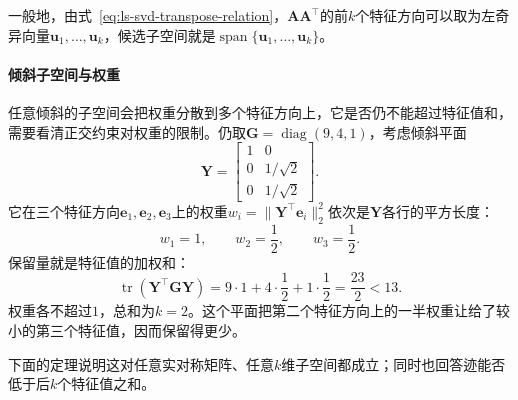 一般地，由式~\eqref{eq:ls-svd-transpose-relation}，$\bm A\bm A^\top$的前$k$个特征方向可以取为左奇异向量$\bm u_1,\ldots,\bm u_k$，候选子空间就是$\operatorname{span}\{\bm u_1,\ldots,\bm u_k\}$。

\paragraph{倾斜子空间与权重}
任意倾斜的子空间会把权重分散到多个特征方向上，它是否仍不能超过特征值和，需要看清正交约束对权重的限制。仍取$\bm G=\operatorname{diag}(9,4,1)$，考虑倾斜平面
\[
 \bm Y=\begin{bmatrix}1&0\\0&1/\sqrt2\\0&1/\sqrt2\end{bmatrix}.
\]
它在三个特征方向$\bm e_1,\bm e_2,\bm e_3$上的权重$w_i=\lVert\bm Y^\top\bm e_i\rVert_2^2$依次是$\bm Y$各行的平方长度：
\[
 w_1=1,\qquad w_2=\frac12,\qquad w_3=\frac12 .
\]
保留量就是特征值的加权和：
\[
 \operatorname{tr}(\bm Y^\top\bm G\bm Y)=9\cdot1+4\cdot\frac12+1\cdot\frac12=\frac{23}2<13 .
\]
权重各不超过$1$，总和为$k=2$。这个平面把第二个特征方向上的一半权重让给了较小的第三个特征值，因而保留得更少。

下面的定理说明这对任意实对称矩阵、任意$k$维子空间都成立；同时也回答迹能否低于后$k$个特征值之和。

